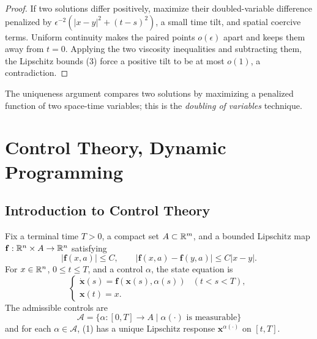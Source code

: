 \begin{proof}
\sketch If two solutions differ positively, maximize their doubled-variable difference penalized by $\epsilon^{-2}(|x-y|^2+(t-s)^2)$, a small time tilt, and spatial coercive terms. Uniform continuity makes the paired points $o(\epsilon)$ apart and keeps them away from $t=0$. Applying the two viscosity inequalities and subtracting them, the Lipschitz bounds (3) force a positive tilt to be at most $o(1)$, a contradiction.
\end{proof}

\begin{remark}
\label{rem:doubling-variables-technique}

The uniqueness argument compares two solutions by maximizing a penalized function of two space-time variables; this is the \textit{doubling of variables} technique.
\end{remark}

\section{Control Theory, Dynamic Programming}
\label{sec:hj-control-theory-dynamic-programming}

\subsection{Introduction to Control Theory}

\begin{definition}
\label{def:controlled-ode-admissible-controls}
Fix a terminal time $T>0$, a compact set $A\subset\mathbb{R}^m$, and a bounded Lipschitz map $\mathbf f:\mathbb{R}^n\times A\to\mathbb{R}^n$ satisfying
\[
|\mathbf f(x,a)|\leq C,
\qquad
|\mathbf f(x,a)-\mathbf f(y,a)|\leq C|x-y|.
\tag{3}
\]
For $x\in\mathbb{R}^n$, $0\leq t\leq T$, and a control $\alpha$, the state equation is
\[
\begin{cases}
\dot{\mathbf x}(s)=\mathbf f(\mathbf x(s),\alpha(s)) & (t<s<T),\\
\mathbf x(t)=x.
\end{cases}
\tag{1}
\]
The admissible controls are
\[
\mathcal{A} = \{\alpha : [0,T] \to A \mid \alpha(\cdot) \text{ is measurable}\}
\tag{2}
\]
and for each $\alpha\in\mathcal A$, (1) has a unique Lipschitz response $\mathbf x^{\alpha(\cdot)}$ on $[t,T]$.
\end{definition}


